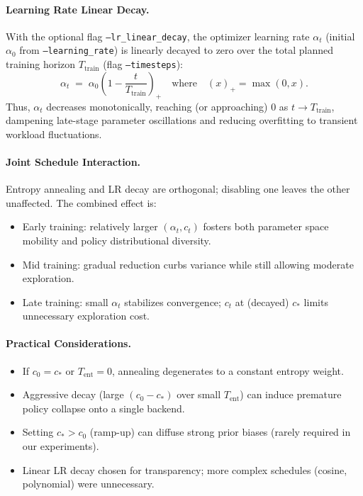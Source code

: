 \paragraph{Learning Rate Linear Decay.}
With the optional flag \texttt{--lr\_linear\_decay}, the optimizer learning rate $\alpha_t$ (initial $\alpha_0$ from \texttt{--learning\_rate}) is linearly decayed to zero over the total planned training horizon $T_{\text{train}}$ (flag \texttt{--timesteps}):
\[
\alpha_t \;=\; \alpha_0 \left( 1 - \frac{t}{T_{\text{train}}} \right)_{+}
\quad\text{where}\quad (x)_{+} = \max(0, x).
\]
Thus, $\alpha_t$ decreases monotonically, reaching (or approaching) $0$ as $t \to T_{\text{train}}$, dampening late-stage parameter oscillations and reducing overfitting to transient workload fluctuations.

\paragraph{Joint Schedule Interaction.}
Entropy annealing and LR decay are orthogonal; disabling one leaves the other unaffected. The combined effect is:
\begin{itemize}
  \item Early training: relatively larger $(\alpha_t, c_t)$ fosters both parameter space mobility and policy distributional diversity.
  \item Mid training: gradual reduction curbs variance while still allowing moderate exploration.
  \item Late training: small $\alpha_t$ stabilizes convergence; $c_t$ at (decayed) $c_\ast$ limits unnecessary exploration cost.
\end{itemize}

\paragraph{Practical Considerations.}
\begin{itemize}
  \item If $c_0 = c_\ast$ or $T_{\text{ent}} = 0$, annealing degenerates to a constant entropy weight.
  \item Aggressive decay (large $(c_0 - c_\ast)$ over small $T_{\text{ent}}$) can induce premature policy collapse onto a single backend.
  \item Setting $c_\ast > c_0$ (ramp-up) can diffuse strong prior biases (rarely required in our experiments).
  \item Linear LR decay chosen for transparency; more complex schedules (cosine, polynomial) were unnecessary.
\end{itemize}

